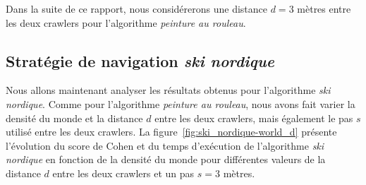 \documentclass[francais,RandD]{rapportPFE}
\begin{document}
			Dans la suite de ce rapport, nous considérerons une distance $d = 3$ mètres entre les deux crawlers pour l'algorithme \textit{peinture au rouleau}.
		\subsection*{Stratégie de navigation \textit{ski nordique}}
			Nous allons maintenant analyser les résultats obtenus pour l'algorithme \textit{ski nordique}.
			Comme pour l'algorithme \textit{peinture au rouleau}, nous avons fait varier la densité du monde et la distance $d$ entre les deux crawlers, mais également le pas $s$ utilisé entre les deux crawlers.
			La figure~\ref{fig:ski_nordique-world_d} présente l'évolution du score de Cohen et du temps d'exécution de l'algorithme \textit{ski nordique} en fonction de la densité du monde pour différentes valeurs de la distance $d$ entre les deux crawlers et un pas $s = 3$ mètres.
\end{document}
